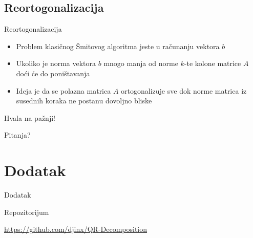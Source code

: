 \documentclass[serbian]{beamer}
\begin{document}
\subsection{Reortogonalizacija}
\begin{frame}{Reortogonalizacija}

\begin{itemize}
	\item Problem klasičnog Šmitovog algoritma jeste u računanju vektora $b$
	\item Ukoliko je norma vektora $b$ mnogo manja od norme $k$-te kolone matrice $A$ doći će do poništavanja
	
	\item Ideja je da se polazna matrica $A$ ortogonalizuje sve dok norme matrica iz susednih koraka ne postanu dovoljno bliske
\end{itemize}

\end{frame}



\begin{frame}

\vspace*{3em}

{\Large Hvala na pa\v znji!} 

\vspace*{1em}

Pitanja?

\end{frame}

\section{Dodatak}

\begin{frame}{Dodatak}


\begin{flushleft}
	{\Large Repozitorijum}
\end{flushleft}

\href{https://github.com/djinx/QR-Decomposition}{https://github.com/djinx/QR-Decomposition}

\end{frame}
\end{document}
